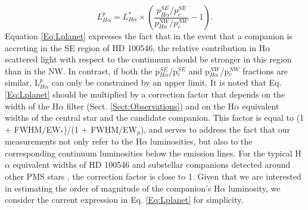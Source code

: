 \documentclass{aa}
\begin{document}
\begin{equation}
\label{Eq:Lplanet}
L_{H\alpha}^p = L_{H\alpha}^* \times \left(\frac{p_{H\alpha}^{SE}/p_c^{SE}}{p_{H\alpha}^{NW}/p_c^{NW}} -1\right).
\end{equation}
Equation \ref{Eq:Lplanet} expresses the fact that in the event that a companion is accreting in the SE region of HD 100546, the relative contribution in H$\alpha$ scattered light with respect to the continuum should be stronger in this region than in the NW. In contrast, if both the p$_{H\alpha}^{SE}$/p$_c^{SE}$ and p$_{H\alpha}^{NW}$/p$_c^{NW}$ fractions are similar, L$_{H\alpha}^p$ can only be constrained by an upper limit. It is noted that Eq. \ref{Eq:Lplanet} should be multiplied by a correction factor that depends on the width of the H$\alpha$ filter (Sect. \ref{Sect:Observations}) and on the H$\alpha$ equivalent widths of the central star and the candidate companion. This factor is equal to (1 + FWHM/EW$_*$)/(1 + FWHM/EW$_p$), and serves to address the fact that our measurements not only refer to the H$\alpha$ luminosities, but also to the corresponding continuum luminosities below the emission lines. For the typical H$\alpha$ equivalent widths of HD 100546 \citep[$\sim$ 24 $\AA$;][]{Fairlamb17} and substellar companions detected around other PMS stars \citep[typically hundreds of $\AA$;][]{Bowler14,Zhou14}, the correction factor is close to 1. Given that we are interested in estimating the order of magnitude of the companion's H$\alpha$ luminosity, we consider the current expression in Eq. \ref{Eq:Lplanet} for simplicity.
\end{document}
